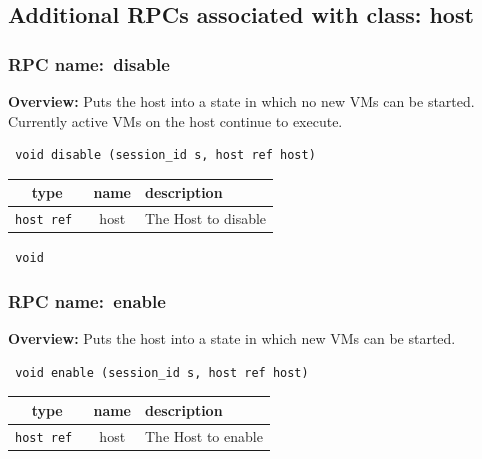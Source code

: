 \subsection{Additional RPCs associated with class: host}
\subsubsection{RPC name:~disable}

{\bf Overview:} 
Puts the host into a state in which no new VMs can be started. Currently
active VMs on the host continue to execute.

\begin{verbatim} void disable (session_id s, host ref host)\end{verbatim}



 
\vspace{0.3cm}
\begin{tabular}{|c|c|p{7cm}|}
 \hline
{\bf type} & {\bf name} & {\bf description} \\ \hline
{\tt host ref } & host & The Host to disable \\ \hline 

\end{tabular}

\vspace{0.3cm}

{\tt 
void
}



\vspace{0.3cm}
\vspace{0.3cm}
\vspace{0.3cm}
\subsubsection{RPC name:~enable}

{\bf Overview:} 
Puts the host into a state in which new VMs can be started.

\begin{verbatim} void enable (session_id s, host ref host)\end{verbatim}



 
\vspace{0.3cm}
\begin{tabular}{|c|c|p{7cm}|}
 \hline
{\bf type} & {\bf name} & {\bf description} \\ \hline
{\tt host ref } & host & The Host to enable \\ \hline 

\end{tabular}

